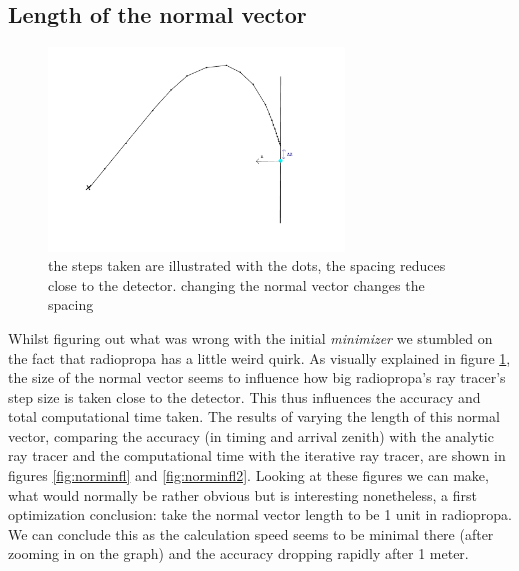 \subsection{Length of the normal vector}
\begin{figure}
	\centering
	\includegraphics[width=0.7\textwidth]{figures/PrincipleNormIllu.pdf}
	\caption{the steps taken are illustrated with the dots, the spacing reduces close to the detector. changing
	the normal vector changes the spacing}
	\label{fig:normexpl}
\end{figure}
Whilst figuring out what was wrong with the initial \textit{minimizer} we
stumbled on the fact that radiopropa has a little weird quirk.  As visually
explained in figure \ref{fig:normexpl}, the size of the normal vector seems to
influence how big radiopropa's ray tracer's step size is taken close to the
detector.  This thus influences the accuracy and total computational time
taken. The results of varying the length of this normal vector, comparing the
accuracy (in timing and arrival zenith) with the analytic ray tracer and the computational time with the
iterative ray tracer, are shown in figures \ref{fig:norminfl} and
\ref{fig:norminfl2}.  Looking at these figures we can make, what would
normally be rather obvious but is interesting nonetheless, a first optimization
conclusion: take the normal vector length to be 1 unit in radiopropa.
We can conclude this as the calculation speed seems to be minimal there (after zooming
in on the graph) and the accuracy dropping rapidly after 1 meter.

